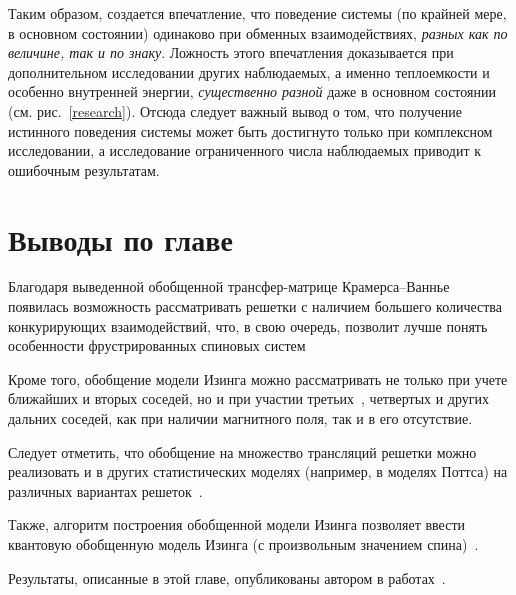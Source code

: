 Таким образом, создается впечатление, что поведение системы (по крайней мере, в основном состоянии) одинаково при обменных взаимодействиях, \emph{разных как по величине, так и по знаку}. Ложность этого впечатления доказывается при дополнительном исследовании других наблюдаемых, а именно теплоемкости и особенно внутренней энергии, \emph{существенно разной} даже в основном состоянии (см. рис.~\ref{research}). Отсюда следует важный вывод о том, что получение истинного поведения системы может быть достигнуто только при комплексном исследовании, а исследование ограниченного числа наблюдаемых приводит к ошибочным результатам.

\section{Выводы по главе}

Благодаря выведенной обобщенной трансфер-матрице Крамерса--Ваннье появилась возможность рассматривать решетки с наличием большего количества конкурирующих взаимодействий, что, в свою очередь, позволит лучше понять особенности фрустрированных спиновых систем

Кроме того, обобщение модели Изинга можно рассматривать не только при учете ближайших и вторых соседей, но и при участии третьих~\cite{zarubin2020}, четвертых и других дальних соседей, как при наличии магнитного поля, так и в его отсутствие.

Следует отметить, что обобщение на множество трансляций решетки можно реализовать и в других статистических моделях (например, в моделях Поттса) на различных вариантах решеток~\cite{proshkinThesis, kassan-ogly2000_1, kassan-ogly2000_2, proshkin2015, kassan-ogly2015}.

Также, алгоритм построения обобщенной модели Изинга позволяет ввести квантовую обобщенную модель Изинга (с произвольным значением спина)~\cite{proshkin2016, proshkin2018}.

Результаты, описанные в этой главе, опубликованы автором в работах~\cite{confbib1, confbib2, vakbib1, vakbib3, confbib6, scbib1}.

\FloatBarrier

